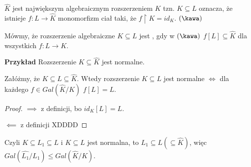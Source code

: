 $\hat{K}$ jest największym algebraicznym rozszerzeniem $K$ tzn. $K\subseteq L$ oznacza, że istnieje $f:L\to\hat{K}$ monomorfizm ciał taki, że $f\restriction K=id_K$. $(\kawa)$
\medskip

Mówmy, że rozszerzenie algebraiczne $K\subseteq L$ jest , gdy w $(\kawa)$ $f[L]\subseteq\hat{K}$ dla wszystkich $f:L\to K$.

\textbf{Przykład} Rozszerzenie $K\subseteq\hat{K}$ jest normalne.

\begin{uwaga}
Załóżmy, że $K\subseteq L\subseteq\hat{K}$. Wtedy rozszerzenie $K\subseteq L$ jest normalne $\iff$ dla każdego $f\in Gal(\hat{K}/K)$ $f[L]=L$.
\end{uwaga}

\begin{proof}
$\implies$ z definicji, bo $id_K[L]=L$.

$\impliedby$ z definicji XDDDD

\end{proof}

Czyli $K\subseteq L_1\subseteq L$ i $K\subseteq L$ jest normalna, to $L_1\subseteq L(\subseteq \hat{K})$, więc $Gal(\hat{L_1}/L_1)\leq Gal(\hat{K}/K)$.

